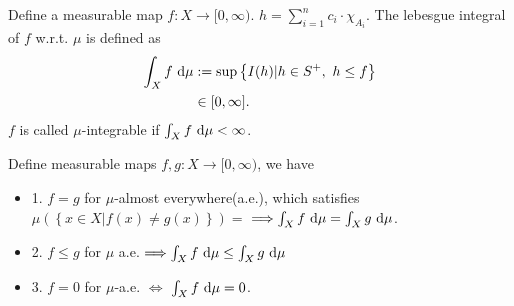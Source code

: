 \documentclass[../../note.tex]{subfiles}
\begin{document}
\begin{definition}
    Define  a measurable map $f: X \rightarrow [0,\infty)$. $h = \sum_{i=1}^{n} c_i \cdot \chi_{A_i}$. The lebesgue integral of $f$ w.r.t. $\mu$ is defined as
    \begin{align}
        \int_X f~{\rm d}\mu
        &:= \sup\left\{I(h) \vert h \in S^
        +,~h \leq f \right\} \\
        & \in [0, \infty].
    \end{align}
    $f$ is called $\mu$-integrable if $\int_X f~{\rm d}\mu < \infty$.
\end{definition}

\begin{property}
    \label{property of lebesgue integral}
    Define measurable maps $f,g: X \rightarrow [0,\infty)$, we have
    \begin{itemize}
        \item 1. $f=g$ for $\mu$-almost everywhere(a.e.), which satisfies $\mu\left(\left\{x \in X \vert f(x) \neq g(x) \right\}\right)=$ $\Longrightarrow \int_X f~{\rm d}\mu = \int_X g~{\rm d}\mu$.
        \item 2. $f \leq g$ for $\mu$ a.e. $\Longrightarrow \int_X f~{\rm d}\mu \leq \int_X g~{\rm d}\mu$
        \item 3. $f=0$ for $\mu$-a.e. $\Longleftrightarrow$ $\int_X f~{\rm d}\mu = 0$.
    \end{itemize}
\end{property}
\end{document}
